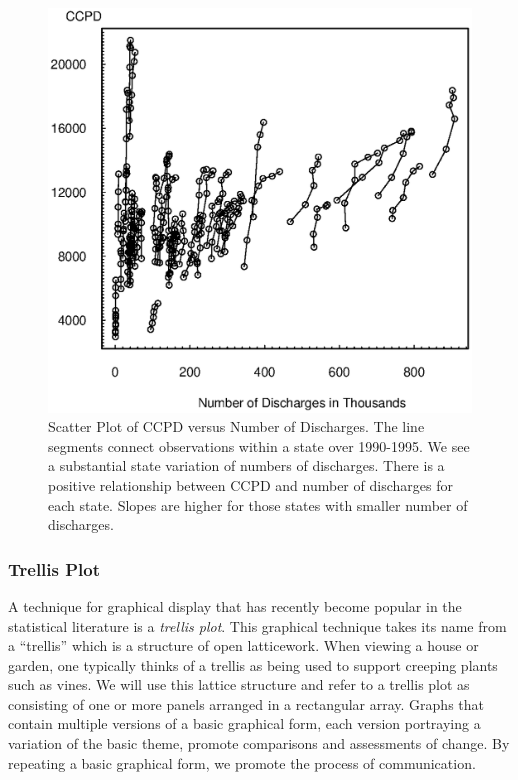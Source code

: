 \begin{figure}[htp]
  \begin{center}
    \includegraphics[width=.7\textwidth]
        {Chapter10LongData//F10MedicarePlotWithLines.eps}
    \caption{\label{F10:MedicarePlotWithLines} \small Scatter Plot of CCPD versus Number of Discharges.
    The line segments connect observations within a state over 1990-1995.
    We see a substantial state variation of numbers of discharges.
    There is a positive relationship between CCPD and number of discharges for each state.
    Slopes are higher for those states with smaller number of discharges.}
  \end{center}
\end{figure}


\subsubsection*{Trellis Plot}

A technique for graphical display that has recently become popular
in the statistical literature is a \emph{trellis plot}. This
graphical technique takes its name from a ``trellis'' which is a
structure of open latticework. When viewing a house or garden, one
typically thinks of a trellis as being used to support creeping
plants such as vines. We will use this lattice structure and refer
to a trellis plot as consisting of one or more panels arranged in a
rectangular array. Graphs that contain multiple versions of a basic
graphical form, each version portraying a variation of the basic
theme, promote comparisons and assessments of change. By repeating a
basic graphical form, we promote the process of communication.

